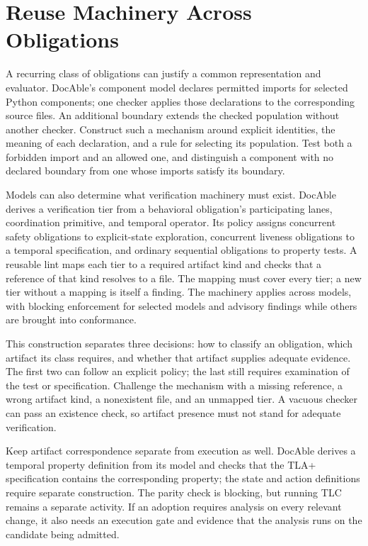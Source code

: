 \section{Reuse Machinery Across Obligations}\label{heading:handbook-reusable-evaluation}

A recurring class of obligations can justify a common representation and evaluator. DocAble's component model declares permitted imports for selected Python components; one checker applies those declarations to the corresponding source files. An additional boundary extends the checked population without another checker. Construct such a mechanism around explicit identities, the meaning of each declaration, and a rule for selecting its population. Test both a forbidden import and an allowed one, and distinguish a component with no declared boundary from one whose imports satisfy its boundary.

Models can also determine what verification machinery must exist. DocAble derives a verification tier from a behavioral obligation's participating lanes, coordination primitive, and temporal operator. Its policy assigns concurrent safety obligations to explicit-state exploration, concurrent liveness obligations to a temporal specification, and ordinary sequential obligations to property tests. A reusable lint maps each tier to a required artifact kind and checks that a reference of that kind resolves to a file. The mapping must cover every tier; a new tier without a mapping is itself a finding. The machinery applies across models, with blocking enforcement for selected models and advisory findings while others are brought into conformance.

This construction separates three decisions: how to classify an obligation, which artifact its class requires, and whether that artifact supplies adequate evidence. The first two can follow an explicit policy; the last still requires examination of the test or specification. Challenge the mechanism with a missing reference, a wrong artifact kind, a nonexistent file, and an unmapped tier. A vacuous checker can pass an existence check, so artifact presence must not stand for adequate verification.

Keep artifact correspondence separate from execution as well. DocAble derives a temporal property definition from its model and checks that the TLA+ specification contains the corresponding property; the state and action definitions require separate construction. The parity check is blocking, but running TLC remains a separate activity. If an adoption requires analysis on every relevant change, it also needs an execution gate and evidence that the analysis runs on the candidate being admitted.

